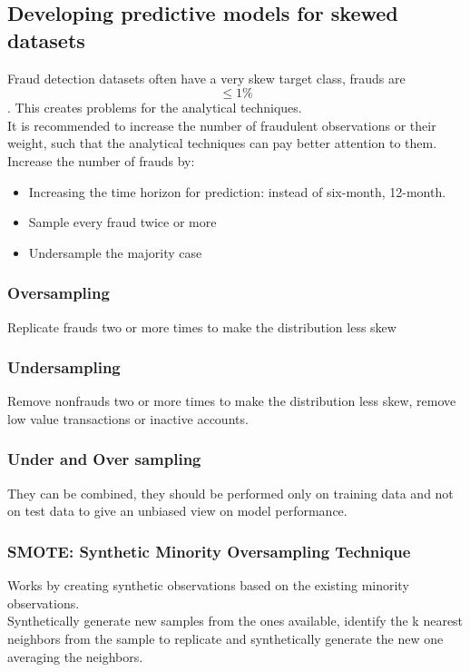     \subsection{Developing predictive models for skewed datasets}
        Fraud detection datasets often have a very skew target class, frauds are $$\leq 1\%$$. This creates problems for the analytical techniques.\\
        It is recommended to increase the number of fraudulent observations or their weight, such that the analytical techniques can pay better attention to them.\\
        Increase the number of frauds by:
        \begin{itemize}
            \item Increasing the time horizon for prediction: instead of six-month, 12-month.
            \item Sample every fraud twice or more 
            \item Undersample the majority case
        \end{itemize}
        \subsubsection{Oversampling}
            Replicate frauds two or more times to make the distribution less skew
        \subsubsection{Undersampling}
            Remove nonfrauds two or more times to make the distribution less skew, remove low value transactions or inactive accounts.
        \subsubsection{Under and Over sampling}
            They can be combined, they should be performed only on training data and not on test data to give an unbiased view on model performance.
        \subsubsection{SMOTE: Synthetic Minority Oversampling Technique}
            Works by creating synthetic observations based on the existing minority observations.\\
            Synthetically generate new samples from the ones available, identify the k nearest neighbors from the sample to replicate and synthetically generate the new one averaging the neighbors.
